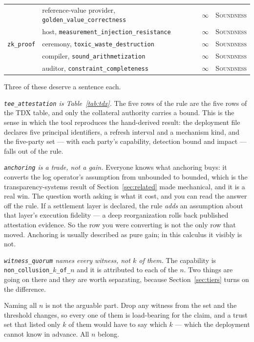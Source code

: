 \documentclass[11pt]{article}
\newcommand{\Never}{\infty}
\newcommand{\ub}{\_\allowbreak}
\begin{document}
\begin{table}[h]
\begin{tabular}{@{}p{2.4cm}>{\raggedright\arraybackslash}p{5.0cm}>{\raggedright\arraybackslash}p{3.0cm}p{2.3cm}@{}}
 & reference-value provider,
\texttt{golden\ub value\ub correctness} & $\Never$ & \textsc{Soundness} \\
 & host, \texttt{measurement\ub injection\ub resistance} & $\Never$ &
\textsc{Soundness} \\
\addlinespace
\texttt{zk\ub proof} & ceremony, \texttt{toxic\ub waste\ub destruction} &
$\Never$ & \textsc{Soundness} \\
 & compiler, \texttt{sound\ub arithmetization} & $\Never$ &
\textsc{Soundness} \\
 & auditor, \texttt{constraint\ub completeness} & $\Never$ &
\textsc{Soundness} \\
\bottomrule
\end{tabular}
\end{table}

Three of these deserve a sentence each.

\emph{\texttt{tee\_attestation} is Table~\ref{tab:tdx}.} The five rows of the
rule are the five rows of the TDX table, and only the collateral authority
carries a bound. This is the sense in which the tool reproduces the
hand-derived result: the deployment file declares five principal identifiers,
a refresh interval and a mechanism kind, and the five-party set --- with each
party's capability, detection bound and impact --- falls out of the rule.

\emph{\texttt{anchoring} is a trade, not a gain.} Everyone knows what
anchoring buys: it converts the log operator's assumption from unbounded to
bounded, which is the transparency-systems result of
Section~\ref{sec:related} made mechanical, and it is a real win. The question
worth asking is what it cost, and you can read the answer off the rule. If a
settlement layer is declared, the rule \emph{adds} an assumption about that
layer's execution fidelity --- a deep reorganization rolls back published
attestation evidence. So the row you were converting is not the only row that
moved. Anchoring is usually described as pure gain; in this calculus it
visibly is not.

\emph{\texttt{witness\_quorum} names every witness, not $k$ of them.} The
capability is \texttt{non\_collusion\_$k$\_of\_$n$} and it is attributed to
each of the $n$. Two things are going on there and they are worth separating,
because Section~\ref{sec:tiers} turns on the difference.

Naming all $n$ is not the arguable part. Drop any witness from the set and
the threshold changes, so every one of them is load-bearing for the claim,
and a trust set that listed only $k$ of them would have to say which $k$ ---
which the deployment cannot know in advance. All $n$ belong.
\end{document}
